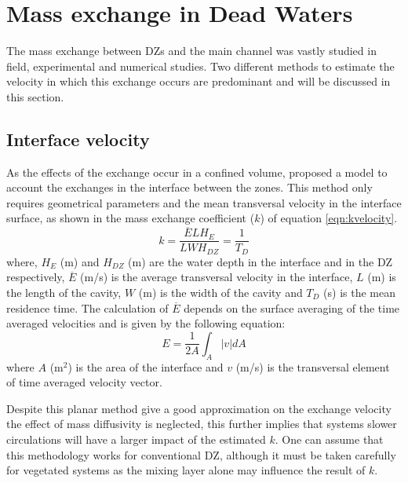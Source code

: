 \section{Mass exchange in Dead Waters}
The mass exchange between DZs and the main channel was vastly studied in field, experimental and numerical studies. Two different methods to estimate the velocity in which this exchange occurs are predominant and will be discussed in this section.

\subsection{Interface velocity}
As the effects of the exchange occur in a confined volume, \textcite{weitbrecht2001} proposed a model to account the exchanges in the interface between the zones. This method only requires geometrical parameters and the mean transversal velocity in the interface surface, as shown in the mass exchange coefficient ($k$) of equation \ref{eqn:kvelocity}.
\begin{equation}
k=\frac{\overline{E}LH_E}{L WH_{DZ}}=\frac{1}{T_D}
\label{eqn:kvelocity}
\end{equation}
where, $H_E$ (m) and $H_{DZ}$ (m) are the water depth in the interface and in the DZ respectively, $\overline{E}$ (m/s) is the average transversal velocity in the interface, $L$ (m) is the length of the cavity, $W$ (m) is the width of the cavity and $T_D$ (s) is the mean residence time. The calculation of $\overline{E}$ depends on the surface averaging of the time averaged velocities and is given by the following equation:
\begin{equation}
E = \frac{1}{2A}\int_{A}^{}\left | v \right |dA
\label{eqn:exchangeVel}
 \end{equation}
where $A$ (m$^2$) is the area of the interface and $v$ (m/s) is the transversal element of time averaged velocity vector.

Despite this planar method give a good approximation on the exchange velocity the effect of mass diffusivity is neglected, this further implies that systems slower circulations will have a larger impact of the estimated $k$. One can assume that this methodology works for conventional DZ, although it must be taken carefully for vegetated systems as the mixing layer alone may influence the result of $k$.
